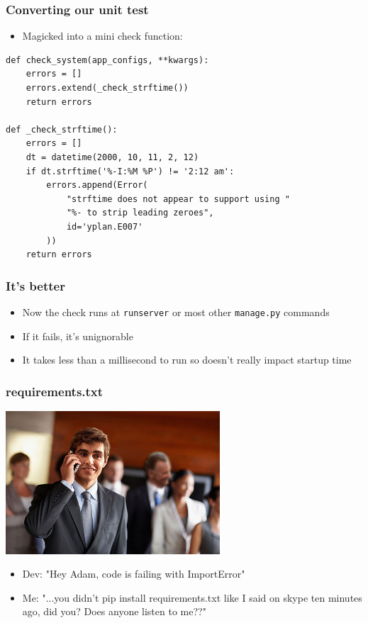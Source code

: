 \documentclass{beamer}
\begin{document}
\begin{frame}[fragile]\frametitle{Converting our unit test}

    \begin{itemize}
        \item Magicked into a mini check function:
    \end{itemize}

    \begin{lstlisting}
def check_system(app_configs, **kwargs):
    errors = []
    errors.extend(_check_strftime())
    return errors

def _check_strftime():
    errors = []
    dt = datetime(2000, 10, 11, 2, 12)
    if dt.strftime('%-I:%M %P') != '2:12 am':
        errors.append(Error(
            "strftime does not appear to support using "
            "%- to strip leading zeroes",
            id='yplan.E007'
        ))
    return errors
    \end{lstlisting}

\end{frame}


\begin{frame}[fragile]\frametitle{It's better}

    \begin{itemize}
        \item Now the check runs at \texttt{runserver} or most other \texttt{manage.py} commands
        \item If it fails, it's unignorable
        \item It takes less than a millisecond to run so doesn't really impact startup time
    \end{itemize}

\end{frame}


\begin{frame}[fragile]\frametitle{requirements.txt}

    \begin{center}
        \includegraphics[width=8cm]{phone-call}
    \end{center}

    \begin{itemize}
        \item Dev: "Hey Adam, code is failing with ImportError"
        \item Me: "...you didn't pip install requirements.txt like I said on skype ten minutes ago, did you? Does anyone listen to me??"
    \end{itemize}

\end{frame}
\end{document}
